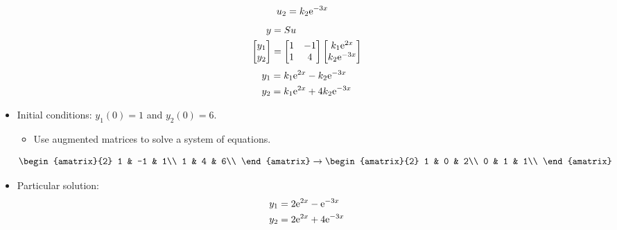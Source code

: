 \documentclass{article}
\begin{document}
\begin{itemize}
\begin{align*}
        u_2 &= k_2\text{e}^{-3x}
    \end{align*}
    \begin{align*}
        y &= Su\\
        \begin{bmatrix}
            y_1\\
            y_2\\
        \end{bmatrix}
        &=
        \begin{bmatrix}
            1 & -1\\
            1 & 4\\
        \end{bmatrix}
        \begin{bmatrix}
            k_1\text{e}^{2x}\\
            k_2\text{e}^{-3x}\\
        \end{bmatrix}
    \end{align*}
    \begin{align*}
        y_1 &= k_1\text{e}^{2x}-k_2\text{e}^{-3x}\\
        y_2 &= k_1\text{e}^{2x}+4k_2\text{e}^{-3x}
    \end{align*}


    \item {}Initial conditions: $y_1(0)=1$ and $y_2(0)=6$.
    \begin{itemize}
        \item Use augmented matrices to solve a system of equations.
    \end{itemize}
    \begin{equation*}
        \begin{amatrix}{2}
            1 & -1 & 1\\
            1 & 4 & 6\\
        \end{amatrix}
        \rightarrow
        \begin{amatrix}{2}
            1 & 0 & 2\\
            0 & 1 & 1\\
        \end{amatrix}
    \end{equation*}
    \item Particular solution:
    \begin{align*}
        y_1 &= 2\text{e}^{2x}-\text{e}^{-3x}\\
        y_2 &= 2\text{e}^{2x}+4\text{e}^{-3x}
    \end{align*}
\end{itemize}
\end{document}
